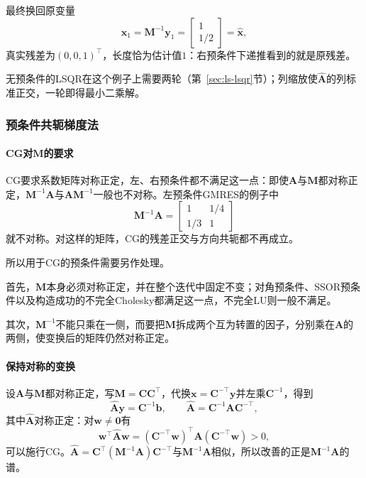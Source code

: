 最终换回原变量
\[
 \bm x_1=\bm M^{-1}\bm y_1=\begin{bmatrix}1\\1/2\end{bmatrix}=\hat{\bm x},
\]
真实残差为$(0,0,1)^\top$，长度恰为估计值$1$：右预条件下递推看到的就是原残差。

无预条件的LSQR在这个例子上需要两轮（第~\ref{sec:ls-lsqr}节）；列缩放使$\widehat{\bm A}$的列标准正交，一轮即得最小二乘解。

\subsubsection{预条件共轭梯度法}
\label{sec:ls-pcg}

\paragraph{CG对$\bm M$的要求}
CG要求系数矩阵对称正定，左、右预条件都不满足这一点：即使$\bm A$与$\bm M$都对称正定，$\bm M^{-1}\bm A$与$\bm A\bm M^{-1}$一般也不对称。左预条件GMRES的例子中
\[
 \bm M^{-1}\bm A=\begin{bmatrix}1&1/4\\1/3&1\end{bmatrix}
\]
就不对称。对这样的矩阵，CG的残差正交与方向共轭都不再成立。

所以用于CG的预条件需要另作处理。

首先，$\bm M$本身必须对称正定，并在整个迭代中固定不变；对角预条件、SSOR预条件以及构造成功的不完全Cholesky都满足这一点，不完全LU则一般不满足。

其次，$\bm M^{-1}$不能只乘在一侧，而要把$\bm M$拆成两个互为转置的因子，分别乘在$\bm A$的两侧，使变换后的矩阵仍然对称正定。

\paragraph{保持对称的变换}
设$\bm A$与$\bm M$都对称正定，写$\bm M=\bm C\bm C^\top$，代换$\bm x=\bm C^{-\top}\bm y$并左乘$\bm C^{-1}$，得到
\begin{equation}
 \widehat{\bm A}\bm y=\bm C^{-1}\bm b,\qquad \widehat{\bm A}=\bm C^{-1}\bm A\bm C^{-\top},
 \label{eq:ls-pcg-transformed-system}
\end{equation}
其中$\widehat{\bm A}$对称正定：对$\bm w\neq\bm0$有
\[
 \bm w^\top\widehat{\bm A}\bm w=(\bm C^{-\top}\bm w)^\top\bm A(\bm C^{-\top}\bm w)>0 ,
\]
可以施行CG。$\widehat{\bm A}=\bm C^\top(\bm M^{-1}\bm A)\bm C^{-\top}$与$\bm M^{-1}\bm A$相似，所以改善的正是$\bm M^{-1}\bm A$的谱。

